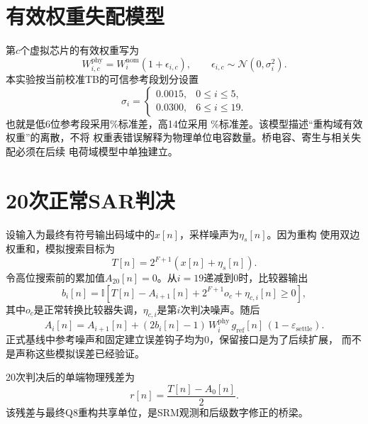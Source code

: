 \documentclass[11pt,a4paper,UTF8,fontset=none,openany]{ctexrep}
\numberwithin{equation}{chapter}
\numberwithin{figure}{chapter}
\numberwithin{table}{chapter}
\begin{document}
\section{有效权重失配模型}

第$c$个虚拟芯片的有效权重写为
\begin{equation}
  W_{i,c}^{\mathrm{phy}}
  = W_i^{\mathrm{nom}}\left(1+\epsilon_{i,c}\right),
  \qquad
  \epsilon_{i,c}\sim \mathcal{N}(0,\sigma_i^2).
  \label{eq:mismatch}
\end{equation}
本实验按当前校准TB的可信参考段划分设置
\begin{equation}
  \sigma_i =
  \begin{cases}
    0.0015, & 0\le i\le 5,\\
    0.0300, & 6\le i\le 19.
  \end{cases}
  \label{eq:mismatch-piecewise}
\end{equation}
也就是低6位参考段采用\LowMismatchPercent\%标准差，高14位采用
\HighMismatchPercent\%标准差。该模型描述“重构域有效权重”的离散，不将
权重表错误解释为物理单位电容数量。桥电容、寄生与相关失配必须在后续
电荷域模型中单独建立。

\section{20次正常SAR判决}

设输入为最终有符号输出码域中的$x[n]$，采样噪声为$\eta_s[n]$。因为重构
使用双边权重和，模拟搜索目标为
\begin{equation}
  T[n]=2^{F+1}\left(x[n]+\eta_s[n]\right).
  \label{eq:target}
\end{equation}
令高位搜索前的累加值$A_{20}[n]=0$。从$i=19$递减到0时，比较器输出
\begin{equation}
  b_i[n]=
  \mathbb{I}\!\left[
    T[n]-A_{i+1}[n]+2^{F+1}o_c+\eta_{c,i}[n]\ge 0
  \right],
  \label{eq:sar-decision}
\end{equation}
其中$o_c$是正常转换比较器失调，$\eta_{c,i}$是第$i$次判决噪声。随后
\begin{equation}
  A_i[n]=A_{i+1}[n]
  +(2b_i[n]-1)\,
  W_i^{\mathrm{phy}}\,
  g_{\mathrm{ref}}[n]\,
  \left(1-\varepsilon_{\mathrm{settle}}\right).
  \label{eq:sar-update}
\end{equation}
正式基线中参考噪声和固定建立误差钩子均为0，保留接口是为了后续扩展，
而不是声称这些模拟误差已经验证。

20次判决后的单端物理残差为
\begin{equation}
  r[n]=\frac{T[n]-A_0[n]}{2}.
  \label{eq:physical-residue}
\end{equation}
该残差与最终Q8重构共享单位，是SRM观测和后级数字修正的桥梁。
\end{document}
